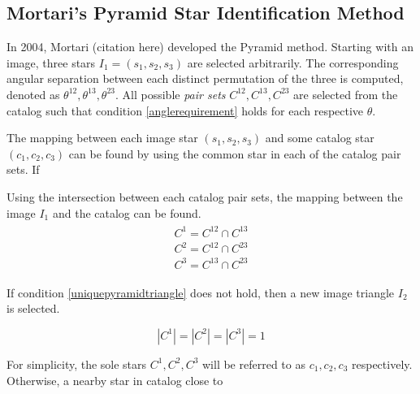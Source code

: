 \subsection{Mortari's Pyramid Star Identification Method}
In 2004, Mortari (citation here) developed the Pyramid method. Starting with an image, three stars $I_1 = (s_1, s_2, s_3)$ are selected arbitrarily. The corresponding angular separation between each distinct permutation of the three is computed, denoted as $\theta^{12}, \theta^{13}, \theta^{23}$. All possible \textit{pair sets} $C^{12}, C^{13}, C^{23}$ are selected from the catalog such that condition \eqref{anglerequirement} holds for each respective $\theta$.

The mapping between each image star $(s_1, s_2, s_3)$ and some catalog star $(c_1, c_2, c_3)$ can be found by using the common star in each of the catalog pair sets. If 

Using the intersection between each catalog pair sets, the mapping between the image $I_1$ and the catalog can be found.
\begin{align}
\begin{split}
C^1 = C^{12} \cap C^{13}
\\
C^2 = C^{12} \cap C^{23}
\\
C^3 = C^{13} \cap C^{23}
\end{split}
\end{align}

If condition \eqref{uniquepyramidtriangle} does not hold, then a new image triangle $I_2$ is selected. 

\begin{equation} \label{uniquepyramidtriangle}
|C^1| = |C^2| = |C^3| = 1
\end{equation}

For simplicity, the sole stars $C^1, C^2, C^3$ will be referred to as $c_1, c_2, c_3$ respectively. Otherwise, a nearby star in catalog close to 
